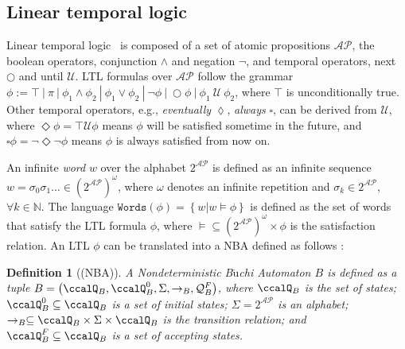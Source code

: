 \documentclass[Afour,sageh,times]{sagej}
\newtheorem{defn}[thm]{Definition}
\begin{document}
\subsection{Linear temporal logic}\label{sec:ltl}
Linear temporal logic~\cite{baier2008principles} is composed of a set of atomic propositions $\mathcal{AP}$, the boolean operators, conjunction $\wedge$ and negation $\neg$, and temporal operators, next $\bigcirc$ and until $\mathcal{U}$. LTL formulas over $\mathcal{AP}$ follow the grammar $\phi:=\top~|~\pi~|~\phi_1\wedge\phi_2~|~\phi_1\vee\phi_2~|~\neg\phi~|~\bigcirc\phi~|~\phi_1~\mathcal{U}~\phi_2$, where $\top$ is unconditionally true.   Other temporal operators, e.g., \textit{eventually} $\lozenge$, \textit{always} $\square$, can be derived from $\mathcal{U}$, where $\Diamond \phi = \top \mathcal{U} \phi$ means $\phi$ will be satisfied sometime in the future, and $\square \phi = \neg \Diamond \neg \phi$ means $\phi$ is always satisfied from now on. %

An infinite \textit{word} $w$ over the alphabet $2^{\mathcal{AP}}$ is defined as an infinite sequence  $w=\sigma_0\sigma_1\ldots\in (2^{\mathcal{AP}})^{\omega}$, where $\omega$ denotes an infinite repetition and $\sigma_k\in2^{\mathcal{AP}}$, $\forall k\in\mathbb{N}$. The language $\texttt{Words}(\phi)=\left\{w|w\models\phi\right\}$ is defined as the set of words that satisfy the LTL formula $\phi$, where $\models\subseteq (2^{\mathcal{AP}})^{\omega}\times\phi$ is the satisfaction relation. An LTL $\phi$ can be translated into a NBA  defined as follows \citep{vardi1986automata}:
\begin{defn}[(NBA)]\label{def:nba}
  A \textit{Nondeterministic B$\ddot{\text{u}}$chi Automaton} $B$ is defined as a tuple $B=\left(\ccalQ_{B}, \ccalQ_{B}^0,\Sigma,\rightarrow_B,\mathcal{Q}_B^F\right)$, where $\ccalQ_{B}$ is the set of states; $\ccalQ_{B}^0\subseteq\ccalQ_{B}$ is a set of initial states; $\Sigma=2^{\mathcal{AP}}$ is an alphabet;  $\rightarrow_{B}\subseteq\ccalQ_{B}\times \Sigma\times\ccalQ_{B}$ is the transition relation;
and $\ccalQ_B^F\subseteq\ccalQ_{B}$ is a set of accepting states.
\end{defn}
\end{document}
